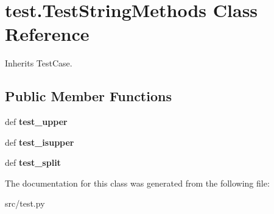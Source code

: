 \hypertarget{classtest_1_1_test_string_methods}{\section{test.\-Test\-String\-Methods \-Class \-Reference}
\label{classtest_1_1_test_string_methods}
}


\-Inherits \-Test\-Case.

\subsection*{\-Public \-Member \-Functions}
\begin{DoxyCompactItemize}
\item 
\hypertarget{classtest_1_1_test_string_methods_a22eca18953d31e7aa44ec2c3c76cbfe4}{def {\bfseries test\-\_\-upper}}\label{classtest_1_1_test_string_methods_a22eca18953d31e7aa44ec2c3c76cbfe4}

\item 
\hypertarget{classtest_1_1_test_string_methods_a476b22edee75ca28bcfc3537dcecd7a1}{def {\bfseries test\-\_\-isupper}}\label{classtest_1_1_test_string_methods_a476b22edee75ca28bcfc3537dcecd7a1}

\item 
\hypertarget{classtest_1_1_test_string_methods_a35decc36a9e989f8021574f3b6aa26b2}{def {\bfseries test\-\_\-split}}\label{classtest_1_1_test_string_methods_a35decc36a9e989f8021574f3b6aa26b2}

\end{DoxyCompactItemize}


\-The documentation for this class was generated from the following file\-:\begin{DoxyCompactItemize}
\item 
src/test.\-py\end{DoxyCompactItemize}
